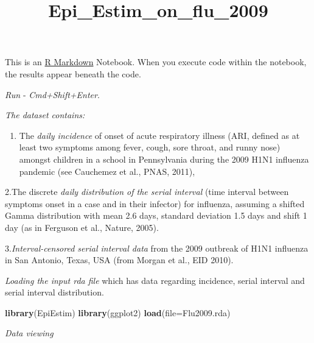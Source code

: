 \documentclass[
]{article}
\title{Epi\_Estim\_on\_flu\_2009}
\author{}
\date{\vspace{-2.5em}}
\newenvironment{Shaded}{\begin{snugshade}}{\end{snugshade}}
\newcommand{\AttributeTok}[1]{\textcolor[rgb]{0.13,0.29,0.53}{#1}}
\newcommand{\DocumentationTok}[1]{\textcolor[rgb]{0.56,0.35,0.01}{\textbf{\textit{#1}}}}
\newcommand{\FunctionTok}[1]{\textcolor[rgb]{0.13,0.29,0.53}{\textbf{#1}}}
\newcommand{\NormalTok}[1]{#1}
\newcommand{\SpecialCharTok}[1]{\textcolor[rgb]{0.81,0.36,0.00}{\textbf{#1}}}
\newcommand{\StringTok}[1]{\textcolor[rgb]{0.31,0.60,0.02}{#1}}
\providecommand{\tightlist}{%
  \setlength{\itemsep}{0pt}\setlength{\parskip}{0pt}}
\begin{document}
\maketitle

This is an \href{http://rmarkdown.rstudio.com}{R Markdown} Notebook.
When you execute code within the notebook, the results appear beneath
the code.

\emph{Run} - \emph{Cmd+Shift+Enter}.

\emph{The dataset contains:}

\begin{enumerate}
\def\labelenumi{\arabic{enumi}.}
\tightlist
\item
  The \emph{daily incidence} of onset of acute respiratory illness (ARI,
  defined as at least two symptoms among fever, cough, sore throat, and
  runny nose) amongst children in a school in Pennsylvania during the
  2009 H1N1 influenza pandemic (see Cauchemez et al., PNAS, 2011),
\end{enumerate}

2.The discrete \emph{daily distribution of the serial interval} (time
interval between symptoms onset in a case and in their infector) for
influenza, assuming a shifted Gamma distribution with mean 2.6 days,
standard deviation 1.5 days and shift 1 day (as in Ferguson et al.,
Nature, 2005).

3.\emph{Interval-censored serial interval data} from the 2009 outbreak
of H1N1 influenza in San Antonio, Texas, USA (from Morgan et al., EID
2010).

\emph{Loading the input rda file} which has data regarding incidence,
serial interval and serial interval distribution.

\begin{Shaded}
\begin{Highlighting}[]
\FunctionTok{library}\NormalTok{(EpiEstim)}
\FunctionTok{library}\NormalTok{(ggplot2)}
\FunctionTok{load}\NormalTok{(}\AttributeTok{file=}\StringTok{\textquotesingle{}Flu2009.rda\textquotesingle{}}\NormalTok{)}
\end{Highlighting}
\end{Shaded}

\emph{Data viewing}

\begin{Shaded}
\end{Shaded}
\end{document}
